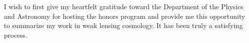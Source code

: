 I wish to first give my heartfelt gratitude toward the Department of the Physics and Astronomy for hosting the honors program and provide me this opportunity to summarize my work in weak lensing cosmology. It has been truly a satisfying process.
